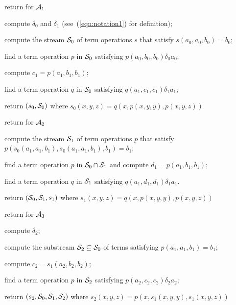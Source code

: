 \LinesNumbered
\begin{algorithm}%

  \caption{return \ldt for $\mathcal{A}_1$
  \label{alg:stream-ldt1}  }

compute $\delta_0$ and $\delta_1$ (see~(\ref{eqn:notation1}) for definition);

compute the stream $\mathcal{S}_0$ of term operations $s$ that satisfy $s(a_0,a_0,b_0) = b_0$;

find a term operation $p$ in $\mathcal{S}_0$ satisfying $p(a_0, b_0, b_0) \mathrel{\delta_0} a_0$;

compute $c_1 = p(a_1,b_1,b_1)$;

find a term operation $q$ in $\mathcal{S}_0$ satisfying $q(a_1, c_1, c_1) \mathrel{\delta_1} a_1$;

return $(s_0, \mathcal{S}_0)$ where $s_0(x,y,z) = q(x,p(x,y,y),p(x,y,z))$
\end{algorithm}


\LinesNumbered
\begin{algorithm}

  \caption{return \ldt for $\mathcal{A}_2$
  \label{alg:stream-ldt2}  }

compute the stream $\mathcal{S}_1$ of term operations $p$ 
that satisfy $p(s_0(a_1,a_1,b_1), s_0(a_1,a_1,b_1), b_1) = b_1$;

find a term operation $p$ in $\mathcal{S}_0 \cap \mathcal{S}_1$ and compute $d_1 = p(a_1,b_1,b_1)$;

find a term operation $q$ in $\mathcal{S}_1$ satisfying $q(a_1, d_1, d_1) \mathrel{\delta_1} a_1$.

return $(\mathcal{S}_0, \mathcal{S}_1, s_1)$ where $s_1(x,y,z) = q(x, p(x,y,y), p(x,y,z))$
\end{algorithm}


\LinesNumbered
\begin{algorithm}

  \caption{return \ldt for $\mathcal{A}_3$
  \label{alg:stream-ldt3}  }

compute $\delta_2$;

compute the substream $\mathcal{S}_2 \subseteq \mathcal{S}_0$ of terms satisfying
 $p(a_1,a_1,b_1) = b_1$;

compute $c_2 = s_1(a_2, b_2, b_2)$;

find a term operation $p$ in $\mathcal{S}_2$ satisfying 
$p(a_2, c_2, c_2) \mathrel{\delta_2} a_2$;

return $(s_2, \mathcal{S}_0, \mathcal{S}_1, \mathcal{S}_2)$ where $s_2(x,y,z) = p(x, s_1(x,y,y), s_1(x,y,z))$
\end{algorithm}



